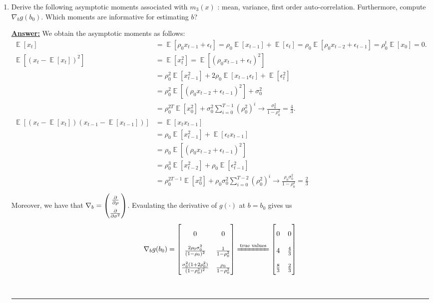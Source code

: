\documentclass{article} %
\DeclareMathOperator*{\E}{\mathbb{E}} %
\theoremstyle{definition}
\newenvironment{solution}[1][Answer]{\begin{singlespace}\underline{\textbf{#1:}}\quad }{\ \rule{0.3em}{0.3em}\end{singlespace}} %
\begin{document}
	
	\begin{enumerate}
		\item Derive the following asymptotic moments associated with $ m_3(x) $ : mean, variance, first order auto-correlation. Furthermore, compute $ \nabla_b g(b_0) $. Which moments are informative for estimating $ b $?
		\begin{solution}
			We obtain the asymptotic moments as follows:
			\begin{align*}
				\E[x_t] & = \E[\rho_0 x_{t-1} + \epsilon_t] = \rho_0 \E[x_{t-1}] + \E[\epsilon_t] = \rho_0 \E[ \rho_0 x_{t-2} + \epsilon_{t-1} ] =  \rho_0^t \E[x_0] = 0.\\
				\E[(x_t - \E[x_t])^2] & = \E[x_t^2] = \E[(\rho_0 x_{t-1} + \epsilon_t)^2 ] \\ &= \rho_0^2 \E[x_{t-1}^2] + 2 \rho_0 \E[x_{t-1} \epsilon_t] + \E[\epsilon_t^2] \\ & = \rho_0^2 \E[ (\rho_0 x_{t-2} + \epsilon_{t-1})^2 ] + \sigma_0^2 \\ & = \rho_0^{2T} \E[x_0^2] + \sigma_0^2 \sum_{i=0}^{T-1} (\rho_0^2)^{i}  \rightarrow \frac{\sigma_0^2}{1 - \rho_0^2} = \frac{4}{3}.\\
				\E[(x_t - \E[x_t]) (x_{t-1} - \E[x_{t-1}]) ]&  =  \E[x_t x_{t-1}]  \\ &= \rho_0  \E[x_{t-1}^2]  + \E[ \epsilon_t x_{t-1} ] \\ & =   \rho_0 \E[ (\rho_0 x_{t-2} + \epsilon_{t-1})^2 ] \\ & =  \rho_0^3 \E[x_{t-2}^2] + \rho_0 \E[\epsilon_{t-1}^2]  \\ & = \rho_0^{2T - 1} \E[x_0^2] + \rho_0  \sigma_0^2 \sum_{i=0}^{T-2} (\rho_0^2)^{i}    \rightarrow  \frac{\rho_0 \sigma_0^2}{1 - \rho_0^2} = \frac{2}{3}   \\
			\end{align*}
			Moreover, we have that $ \nabla_b =
				\renewcommand\arraystretch{1.6}
			\begin{pmatrix}
				\frac{\partial}{\partial \rho} \\
				 \frac{\partial}{\partial \sigma^2}
			\end{pmatrix} $. Evaulating the derivative of $ g(\cdot) $ at $ b = b_0 $ gives us
			\begin{align*}
				\nabla_b g(b_0) = 
				\renewcommand\arraystretch{2}
				\begin{bmatrix}
					0 & 0 \\ \frac{2 \rho_0 \sigma_0^2}{(1 - \rho_0)^2} & \frac{1}{1 - \rho_0^2} \\  \frac{\sigma_0^2( 1 + 2 \rho_0^2)}{(1 - \rho_0^2)^2}  & \frac{\rho_0}{1 - \rho_0^2}
				\end{bmatrix}
				\xlongequal{\text{true values}}
				\begin{bmatrix}
					0 & 0 \\  4 & \frac{4}{3} \\  \frac{8}{3} & \frac{2}{3}
				\end{bmatrix}
			\end{align*}
		

\end{solution}
\end{enumerate}
\end{document}
